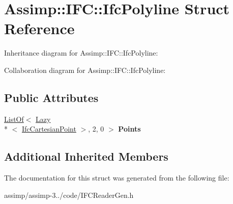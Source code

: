 \hypertarget{struct_assimp_1_1_i_f_c_1_1_ifc_polyline}{\section{Assimp\+:\+:I\+F\+C\+:\+:Ifc\+Polyline Struct Reference}
\label{struct_assimp_1_1_i_f_c_1_1_ifc_polyline}
}


Inheritance diagram for Assimp\+:\+:I\+F\+C\+:\+:Ifc\+Polyline\+:


Collaboration diagram for Assimp\+:\+:I\+F\+C\+:\+:Ifc\+Polyline\+:
\subsection*{Public Attributes}
\begin{DoxyCompactItemize}
\item 
\hypertarget{struct_assimp_1_1_i_f_c_1_1_ifc_polyline_a19581381c755e5ae9615e4e64680786e}{\hyperlink{struct_assimp_1_1_s_t_e_p_1_1_list_of}{List\+Of}$<$ \hyperlink{struct_assimp_1_1_s_t_e_p_1_1_lazy}{Lazy}\\*
$<$ \hyperlink{struct_assimp_1_1_i_f_c_1_1_ifc_cartesian_point}{Ifc\+Cartesian\+Point} $>$, 2, 0 $>$ {\bfseries Points}}\label{struct_assimp_1_1_i_f_c_1_1_ifc_polyline_a19581381c755e5ae9615e4e64680786e}

\end{DoxyCompactItemize}
\subsection*{Additional Inherited Members}


The documentation for this struct was generated from the following file\+:\begin{DoxyCompactItemize}
\item 
assimp/assimp-\/3../code/I\+F\+C\+Reader\+Gen.\+h\end{DoxyCompactItemize}
